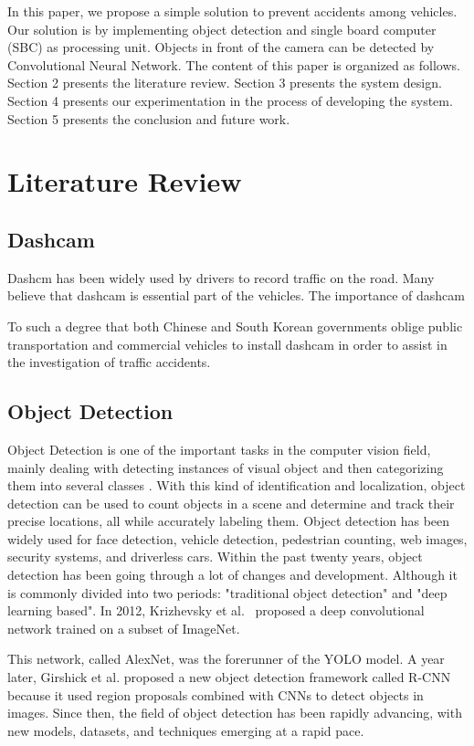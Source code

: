 \documentclass[conference]{IEEEtran}
\begin{document}
In this paper, we propose a simple solution to prevent accidents among vehicles. Our solution is by implementing object detection and single board computer (SBC) as processing unit. Objects in front of the camera can be detected by Convolutional Neural Network. 
The content of this paper is organized as follows. Section 2 presents the literature review. Section 3 presents the system design. Section 4 presents our experimentation in the process of developing the system. Section 5 presents the conclusion and future work.

\section{Literature Review}
\subsection{Dashcam}
Dashcm has been widely used by drivers to record traffic on the road. Many believe that dashcam is essential part of the vehicles.
The importance of dashcam 

To such a degree that both Chinese and South Korean governments oblige public transportation and commercial vehicles to install dashcam in order to assist in the investigation of traffic accidents\cite{Korea Dashcam}.


\subsection{Object Detection}
Object Detection is one of the important tasks in the computer vision field, mainly dealing with detecting instances of visual object and then categorizing them into several classes \cite{b2}.
With this kind of identification and localization, object detection can be used to count objects in a scene and determine and track their precise locations, all while accurately labeling them.
Object detection has been widely used for face detection, vehicle detection, pedestrian counting, web images, security systems, and driverless cars.
Within the past twenty years, object detection has been going through a lot of changes and development. Although it is commonly divided into two periods: "traditional object detection" and "deep learning based".
In 2012, Krizhevsky et al.~\cite{b3} proposed a deep convolutional network trained on a subset of ImageNet. 

This network, called AlexNet, was the forerunner of the YOLO model.
A year later, Girshick et al. \@ proposed a new object detection framework called R-CNN~\cite{b4} because it used region proposals combined with CNNs to detect objects in images.
Since then, the field of object detection has been rapidly advancing, with new models, datasets, and techniques emerging at a rapid pace. 
\end{document}
